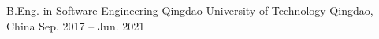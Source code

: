 
\begin{cventries}
\vspace{-4mm}
\cventry
  {B.Eng. in Software Engineering}
  {Qingdao University of Technology}
  {Qingdao, China}
  {Sep. 2017 – Jun. 2021}
  {}
\end{cventries}